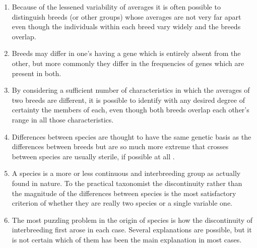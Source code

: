 \begin{enumerate}
\item Because of the lessened variability of averages it is often possible
to distinguish breeds (or other groups) whose averages are not very far
apart even though the individuals within each breed vary widely and
the breeds overlap.
\item Breeds may differ in one's having a gene which is entirely absent
from the other, but more commonly they differ in the frequencies of
genes which are present in both.
\item By considering a sufficient number of characteristics in which
the averages of two breeds are different, it is possible to identify with
any desired degree of certainty the members of each, even though both
breeds overlap each other's range in all those characteristics.
\item Differences between species are thought to have the same genetic
basis as the differences between breeds but are so much more extreme
that crosses between species are usually sterile, if possible at all .
\item A species is a more or less continuous and interbreeding group as
actually found in nature. To the practical taxonomist the discontinuity
rather than the magnitude of the differences between species is the most
satisfactory criterion of whether they are really two species or a single
variable one.
\item The most puzzling problem in the origin of species is how the
discontinuity of interbreeding first arose in each case. Several explanations
are possible, but it is not certain which of them has been the main
explanation in most cases.
\end{enumerate}
